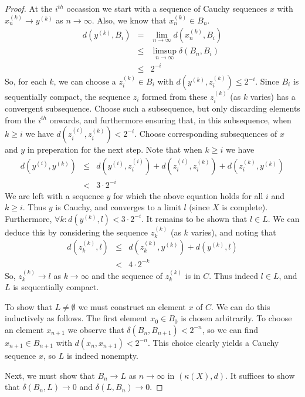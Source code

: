\documentclass[a4paper,11pt]{article}
\begin{document}
\begin{proof}
At the $i^{th}$ occassion we start with a sequence of Cauchy sequences $x$ with
$x^{(k)}_n\to y^{(k)}$ as $n\to\infty$.  Also, we know that $x^{(k)}_n\in B_n$.
%
\begin{eqnarray*}
d(y^{(k)},B_i)
  &=& \lim_{n\to\infty}d(x^{(k)}_n,B_i) \\
  &\leq& \limsup_{n\to\infty}\delta(B_n,B_i) \\
  &\leq& 2^{-i}
\end{eqnarray*}
%
So, for each $k$, we can choose a $z_i^{(k)}\in B_i$ with
$d(y^{(k)},z_i^{(k)})\leq2^{-i}$.  Since $B_i$ is sequentially compact, the
sequence $z_i$ formed from these $z_i^{(k)}$
(as $k$ varies) has a convergent subsequence.  Choose
such a subsequence, but only discarding elements from the $i^{th}$ onwards, and
furthermore ensuring that, in this subsequence, when $k\geq i$ we have
$d(z_i^{(i)},z_i^{(k)})<2^{-i}$.  
Choose corresponding subsequences of $x$ and $y$ in preperation for the next
step.  Note that when $k\geq i$ we have
%
\begin{eqnarray*}
d(y^{(i)},y^{(k)})
  &\leq& d(y^{(i)},z_i^{(i)})+d(z_i^{(i)},z_i^{(k)})+d(z_i^{(k)},y^{(k)}) \\
  &<& 3\cdot2^{-i}
\end{eqnarray*}
%
We are left with a sequence $y$ for which the above equation holds for all $i$
and $k\geq i$.  Thus $y$ is Cauchy, and converges to
a limit $l$ (since $X$ is complete).  Furthermore,
$\forall k:d(y^{(k)},l)<3\cdot 2^{-i}$.  It
remains to be shown that $l\in L$.  We can deduce this by considering the
sequence $z_k^{(k)}$ (as $k$ varies), and noting that
%
\begin{eqnarray*}
d(z_k^{(k)},l)
  &\leq& d(z_k^{(k)},y^{(k)})+d(y^{(k)},l) \\
  &<& 4\cdot2^{-k}
\end{eqnarray*}
%
So, $z_k^{(k)}\to l$ as $k\to\infty$ and the sequence of $z_k^{(k)}$ is in $C$.
Thus indeed $l\in L$, and $L$ is sequentially compact.

To show that $L\not=\emptyset$ we must construct an
element $x$ of $C$.  We can do this
inductively as follows.  The first element $x_0\in B_0$ is chosen arbitrarily.
To choose an element $x_{n+1}$ we observe that $\delta(B_n,B_{n+1})<2^{-n}$, so
we can find $x_{n+1}\in B_{n+1}$ with $d(x_n,x_{n+1})<2^{-n}$.  This choice
clearly yields a Cauchy sequence $x$, so $L$ is indeed nonempty.

Next, we must show that $B_n\to L$ as $n\to\infty$
in $(\kappa(X),d)$.  It suffices to show
that $\delta(B_n,L)\to0$ and $\delta(L,B_n)\to0$.


\end{proof}
\end{document}

